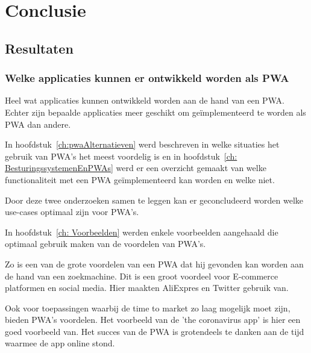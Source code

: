 \chapter{Conclusie}
\label{ch:conclusie}

	  

\section{Resultaten}

	\subsection{Welke applicaties kunnen er ontwikkeld worden als PWA}
	
		Heel wat applicaties kunnen ontwikkeld worden aan de hand van een PWA. Echter zijn bepaalde applicaties meer geschikt om geïmplementeerd te worden als PWA dan andere.
		
		In hoofdstuk~\ref{ch:pwaAlternatieven} werd beschreven in welke situaties het gebruik van PWA's het meest voordelig is en in hoofdstuk~\ref{ch: BesturingssystemenEnPWAs} werd er een overzicht gemaakt van welke functionaliteit met een PWA geïmplementeerd kan worden en welke niet.
		
		Door deze twee onderzoeken samen te leggen kan er geconcludeerd worden welke use-cases optimaal zijn voor PWA's.
		
		In hoofdstuk~\ref{ch: Voorbeelden} werden enkele voorbeelden aangehaald die optimaal gebruik maken van de voordelen van PWA's.
			
		Zo is een van de grote voordelen van een PWA dat hij gevonden kan worden aan de hand van een zoekmachine. Dit is een groot voordeel voor E-commerce platformen en social media. Hier maakten AliExpres en Twitter gebruik van.
		
		Ook voor toepassingen waarbij de time to market zo laag mogelijk moet zijn, bieden PWA's voordelen. Het voorbeeld van de 'the coronavirus app' is hier een goed voorbeeld van. Het succes van de PWA is grotendeels te danken aan de tijd waarmee de app online stond.

